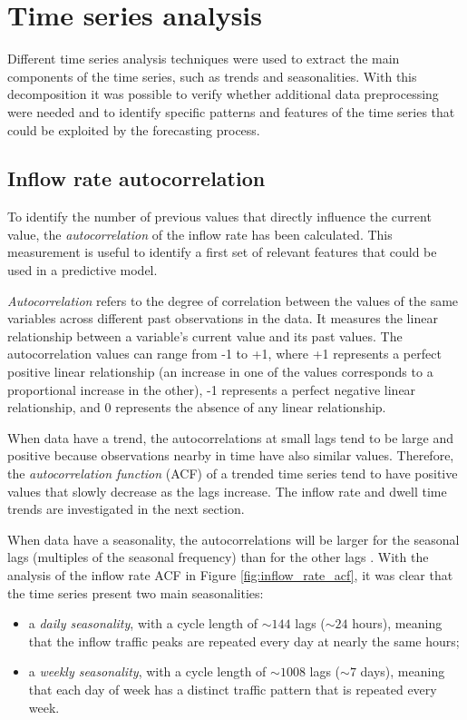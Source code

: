 \section{Time series analysis}
\label{sec:time_series_analysis}

Different time series analysis techniques were used to extract the main components of the time series, such as trends and seasonalities. With this decomposition it was possible to verify whether additional data preprocessing were needed and to identify specific patterns and features of the time series that could be exploited by the forecasting process.

\subsection{Inflow rate autocorrelation}
\label{subsec:inflow_rate_autocorrelation}

To identify the number of previous values that directly influence the current value, the \emph{autocorrelation} of the inflow rate has been calculated. This measurement is useful to identify a first set of relevant features that could be used in a predictive model.

\emph{Autocorrelation} refers to the degree of correlation between the values of the same variables across different past observations in the data. It measures the linear relationship between a variable's current value and its past values. The autocorrelation values can range from -1 to +1, where +1 represents a perfect positive linear relationship (an increase in one of the values corresponds to a proportional increase in the other), -1 represents a perfect negative linear relationship, and 0 represents the absence of any linear relationship.

When data have a trend, the autocorrelations at small lags tend to be large and positive because observations nearby in time have also similar values. Therefore, the \emph{autocorrelation function} (ACF) of a trended time series tend to have positive values that slowly decrease as the lags increase. The inflow rate and dwell time trends are investigated in the next section.

When data have a seasonality, the autocorrelations will be larger for the seasonal lags (multiples of the seasonal frequency) than for the other lags \cite{hyndman2018}. With the analysis of the inflow rate ACF in Figure \ref{fig:inflow_rate_acf}, it was clear that the time series present two main seasonalities:
\begin{itemize}
  \item a \emph{daily seasonality}, with a cycle length of \( \sim144 \) lags (\( \sim24 \) hours), meaning that the inflow traffic peaks are repeated every day at nearly the same hours;
  \item a \emph{weekly seasonality}, with a cycle length of \( \sim1008 \) lags (\( \sim7 \) days), meaning that each day of week has a distinct traffic pattern that is repeated every week.
\end{itemize}

